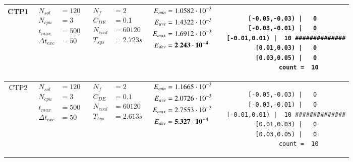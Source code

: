 \begin{table*} [!t]
\begin{tabular}[c]{ccccc}
CTP1
&
{$\!\begin{aligned}
    N_{sol}        &= 120 \\
	N_{cpu}        &= 3 \\
	t_{max}        &= 500 \\
	\Delta t_{exc} &= 50
\end{aligned}$}
&
{$\!\begin{aligned}
	N_{f}    &= 2 \\
	C_{DE}   &= 0.1 \\
	N_{eval} &= 60120 \\
	T_{sys}  &= 2.723s
\end{aligned}$}
&
{$\!\begin{aligned}
    E_{min} &= 1.0582\cdot 10^{-3} \\
    E_{ave} &= 1.4322\cdot 10^{-3} \\
    E_{max} &= 1.6912\cdot 10^{-3} \\
    E_{dev} &= {\bf 2.243\cdot 10^{-4}}
\end{aligned}$}
&
\begin{minipage}{4.1cm} \fontsize{5pt}{6pt}
\begin{verbatim}
 [-0.05,-0.03) |   0 
 [-0.03,-0.01) |   0 
  [-0.01,0.01) |  10 ##############
   [0.01,0.03) |   0 
   [0.03,0.05) |   0 
         count =  10
 \end{verbatim}
\end{minipage} \\

\hline



CTP2
&
{$\!\begin{aligned}
    N_{sol}        &= 120 \\
	N_{cpu}        &= 3 \\
	t_{max}        &= 500 \\
	\Delta t_{exc} &= 50
\end{aligned}$}
&
{$\!\begin{aligned}
	N_{f}    &= 2 \\
	C_{DE}   &= 0.1 \\
	N_{eval} &= 60120 \\
	T_{sys}  &= 2.613s
\end{aligned}$}
&
{$\!\begin{aligned}
    E_{min} &= 1.1665\cdot 10^{-3} \\
    E_{ave} &= 2.0726\cdot 10^{-3} \\
    E_{max} &= 2.7553\cdot 10^{-3} \\
    E_{dev} &= {\bf 5.327\cdot 10^{-4}}
\end{aligned}$}
&
\begin{minipage}{4.1cm} \fontsize{5pt}{6pt}
\begin{verbatim}
 [-0.05,-0.03) |   0 
 [-0.03,-0.01) |   0 
  [-0.01,0.01) |  10 ##############
   [0.01,0.03) |   0 
   [0.03,0.05) |   0 
         count =  10
 \end{verbatim}
\end{minipage} \\


\end{tabular}
\end{table*}
